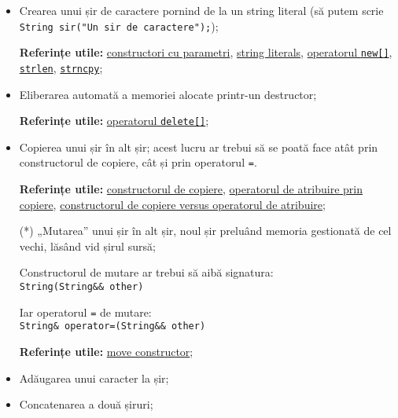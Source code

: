 \begin{enumerate}
\begin{itemize}
        \item Crearea unui șir de caractere pornind de la un string literal (să putem scrie \texttt{String sir("Un sir de caractere");});

        \textbf{Referințe utile:} \href{https://en.cppreference.com/w/cpp/language/constructor}{constructori cu parametri}, \href{https://en.cppreference.com/w/cpp/language/string_literal}{string literals}, \href{https://cplusplus.com/reference/new/operator\%20new[]/}{operatorul \texttt{new[]}}, \href{https://en.cppreference.com/w/cpp/string/byte/strlen}{\texttt{strlen}}, \href{https://en.cppreference.com/w/c/string/byte/strncpy}{\texttt{strncpy}};
        
        \item Eliberarea automată a memoriei alocate printr-un destructor;

        \textbf{Referințe utile:} \href{https://www.geeksforgeeks.org/delete-in-c/}{operatorul \texttt{delete[]}};
        
        \item Copierea unui șir în alt șir; acest lucru ar trebui să se poată face atât prin constructorul de copiere, cât și prin operatorul \texttt{=}.

        \textbf{Referințe utile:} \href{https://www.geeksforgeeks.org/copy-constructor-in-cpp/}{constructorul de copiere}, \href{https://en.cppreference.com/w/cpp/language/copy_assignment}{operatorul de atribuire prin copiere}, \href{https://www.geeksforgeeks.org/copy-constructor-vs-assignment-operator-in-c/}{constructorul de copiere versus operatorul de atribuire};
        
        \item[(*)] „Mutarea” unui șir în alt șir, noul șir preluând memoria gestionată de cel vechi, lăsând vid șirul sursă;

        Constructorul de mutare ar trebui să aibă signatura:\\[0.5em]
        \texttt{String(String\&\& other)}
    
        Iar operatorul \texttt{=} de mutare:\\[0.5em]
        \texttt{String\& operator=(String\&\& other)}

        \textbf{Referințe utile:} \href{https://en.cppreference.com/w/cpp/language/move_constructor}{move constructor};

        \item Adăugarea unui caracter la șir;

        \item Concatenarea a două șiruri;


\end{itemize}
\end{enumerate}
